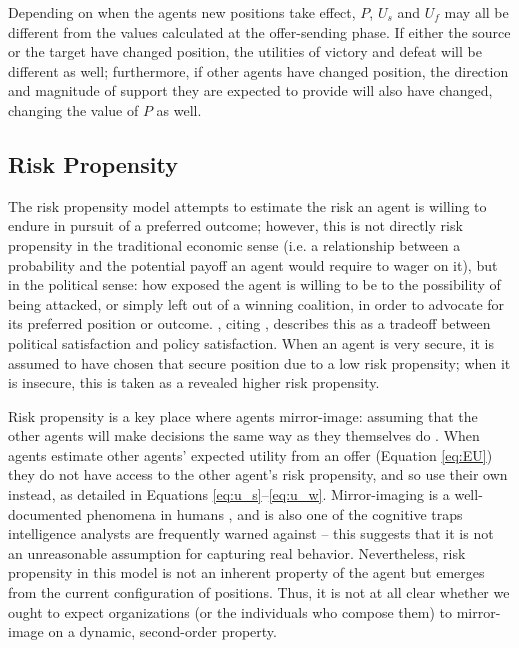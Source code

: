 Depending on when the agents new positions take effect, $P$, $U_s$ and $U_f$ may all be different from the values calculated at the offer-sending phase. If either the source or the target have changed position, the utilities of victory and defeat will be different as well; furthermore, if other agents have changed position, the direction and magnitude of support they are expected to provide will also have changed, changing the value of $P$ as well.

\subsection{Risk Propensity}

The risk propensity model attempts to estimate the risk an agent is willing to endure in pursuit of a preferred outcome; however, this is not directly risk propensity in the traditional economic sense (i.e. a relationship between a probability and the potential payoff an agent would require to wager on it), but in the political sense: how exposed the agent is willing to be to the possibility of being attacked, or simply left out of a winning coalition, in order to advocate for its preferred position or outcome. \citet{bdm_2002}, citing \citet{lamborn_1991}, describes this as a tradeoff between political satisfaction and policy satisfaction. When an agent is very secure, it is assumed to have chosen that secure position due to a low risk propensity; when it is insecure, this is taken as a revealed higher risk propensity.

Risk propensity is a key place where agents mirror-image: assuming that the other agents will make decisions the same way as they themselves do \citep{heuer_2001}. When agents estimate other agents' expected utility from an offer (Equation \ref{eq:EU}) they do not have access to the other agent's risk propensity, and so use their own instead, as detailed in Equations \ref{eq:u_s}--\ref{eq:u_w}. Mirror-imaging is a well-documented phenomena in humans \citep{meltzoff_2003}, and is also one of the cognitive traps intelligence analysts are frequently warned against \citep{heuer_2001} -- this suggests that it is not an unreasonable assumption for capturing real behavior. Nevertheless, risk propensity in this model is not an inherent property of the agent but emerges from the current configuration of positions. Thus, it is not at all clear whether we ought to expect organizations (or the individuals who compose them) to mirror-image on a dynamic, second-order property.

